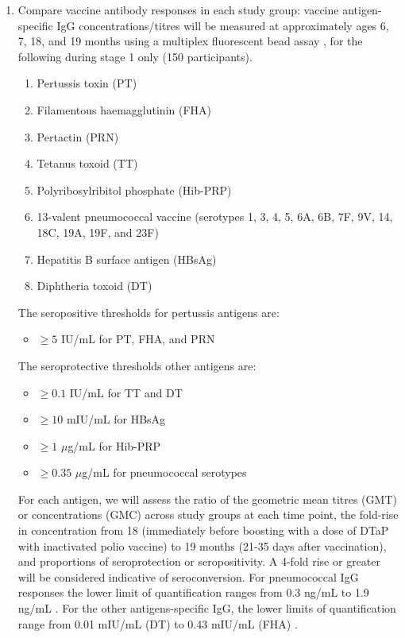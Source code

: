 \documentclass{bmcart}
\begin{document}
\begin{enumerate}[resume]
	\item Compare vaccine antibody responses in each study group:
	vaccine antigen-specific IgG concentrations/titres will be measured at approximately ages 6, 7, 18, and 19 months using a multiplex fluorescent bead assay \cite{van2008development, McAlister2021}, for the following during stage 1 only (150 participants).
	\begin{enumerate}
		\item Pertussis toxin (PT)
		\item Filamentous haemagglutinin (FHA)
		\item Pertactin (PRN)
		\item Tetanus toxoid (TT)
		\item Polyribosylribitol phosphate (Hib-PRP)
		\item 13-valent pneumococcal vaccine (serotypes 1, 3, 4, 5, 6A, 6B, 7F, 9V, 14, 18C, 19A, 19F, and 23F)
		\item Hepatitis B surface antigen (HBsAg)
		\item Diphtheria toxoid (DT)
	\end{enumerate}
	The seropositive thresholds\label{lab:sero-thresholds} for pertussis antigens are:
	\begin{itemize}
	    \item $\geq 5$ IU/mL for PT, FHA, and PRN
	\end{itemize}
	The seroprotective thresholds other antigens are:
	\begin{itemize}
		\item $\geq 0.1$ IU/mL  for TT \cite{whotetanus} and DT
		\item $\geq 10$ mIU/mL for HBsAg
		\item $\geq 1$ $\mu$g/mL for Hib-PRP \cite{kayhty1983protective}
		\item $\geq 0.35$ $\mu$g/mL for pneumococcal serotypes \cite{siber2007estimating,whopneumo}
	\end{itemize}
	For each antigen, we will assess the ratio of the geometric mean titres (GMT) or concentrations (GMC) across study groups at each time point, the fold-rise in concentration from 18 (immediately before boosting with a dose of DTaP with inactivated polio vaccine) to 19 months (21-35 days after vaccination), and proportions of seroprotection or seropositivity.
	A 4-fold rise or greater will be considered indicative of seroconversion.
	For pneumococcal IgG responses the lower limit of quantification ranges from 0.3 ng/mL to 1.9 ng/mL \cite{menon2012children}.
	For the other antigens-specific IgG, the lower limits of quantification range from 0.01 mIU/mL (DT) to 0.43 mIU/mL (FHA) \cite{McAlister2021}.
\end{enumerate}
\end{document}
